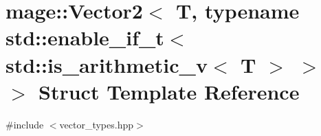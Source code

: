 \hypertarget{structmage_1_1_vector2_3_01_t_00_01typename_01std_1_1enable__if__t_3_01std_1_1is__arithmetic__v_3_01_t_01_4_01_4_01_4}{}\section{mage\+:\+:Vector2$<$ T, typename std\+:\+:enable\+\_\+if\+\_\+t$<$ std\+:\+:is\+\_\+arithmetic\+\_\+v$<$ T $>$ $>$ $>$ Struct Template Reference}
\label{structmage_1_1_vector2_3_01_t_00_01typename_01std_1_1enable__if__t_3_01std_1_1is__arithmetic__v_3_01_t_01_4_01_4_01_4}


{\ttfamily \#include $<$vector\+\_\+types.\+hpp$>$}

